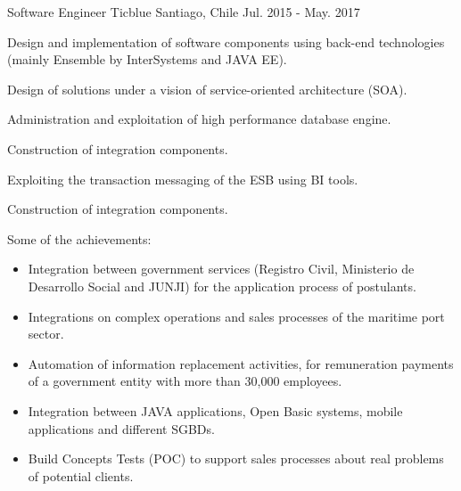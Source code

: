 \begin{cventries}
  \cventry
    {Software Engineer} %
    {Ticblue} %
    {Santiago, Chile} %
    {Jul. 2015 - May. 2017} %
    {
      \begin{cvitems} %
        \item {Design and implementation of software components using back-end technologies (mainly Ensemble by InterSystems and JAVA EE).}
        \item {Design of solutions under a vision of service-oriented architecture (SOA).}
        \item {Administration and exploitation of high performance database engine.}
        \item {Construction of integration components.}
        \item {Exploiting the transaction messaging of the ESB using BI tools.}
        \item {Construction of integration components.}
        \item {Some of the achievements:}
        \begin{itemize}
        	\item{Integration between government services (Registro Civil, Ministerio de Desarrollo Social and JUNJI) for the application process of postulants.}
        	\item{Integrations on complex operations and sales processes of the maritime port sector.}
        	\item{Automation of information replacement activities, for remuneration payments of a government entity with more than 30,000 employees.}
        	\item{Integration between JAVA applications, Open Basic systems, mobile applications and different SGBDs.}
        	\item{Build Concepts Tests (POC) to support sales processes about real problems of potential clients.}        	
      	\end{itemize}
      \end{cvitems}
    }


\end{cventries}
